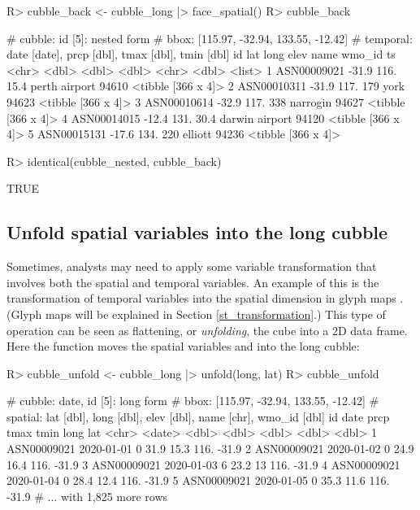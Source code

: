 \documentclass[
]{jss}
\begin{document}
\begin{CodeChunk}
\begin{CodeInput}
R> cubble_back <- cubble_long |> face_spatial()
R> cubble_back
\end{CodeInput}
\begin{CodeOutput}
# cubble:   id [5]: nested form
# bbox:     [115.97, -32.94, 133.55, -12.42]
# temporal: date [date], prcp [dbl], tmax [dbl], tmin [dbl]
  id            lat  long  elev name           wmo_id ts                
  <chr>       <dbl> <dbl> <dbl> <chr>           <dbl> <list>            
1 ASN00009021 -31.9  116.  15.4 perth airport   94610 <tibble [366 x 4]>
2 ASN00010311 -31.9  117. 179   york            94623 <tibble [366 x 4]>
3 ASN00010614 -32.9  117. 338   narrogin        94627 <tibble [366 x 4]>
4 ASN00014015 -12.4  131.  30.4 darwin airport  94120 <tibble [366 x 4]>
5 ASN00015131 -17.6  134. 220   elliott         94236 <tibble [366 x 4]>
\end{CodeOutput}
\begin{CodeInput}
R> identical(cubble_nested, cubble_back)
\end{CodeInput}
\begin{CodeOutput}
[1] TRUE
\end{CodeOutput}
\end{CodeChunk}

\hypertarget{unfold}{%
\subsection{Unfold spatial variables into the long cubble}\label{unfold}}

Sometimes, analysts may need to apply some variable transformation that involves both the spatial and temporal variables. An example of this is the transformation of temporal variables into the spatial dimension in glyph maps \citep{Wickham2012-yr}. (Glyph maps will be explained in Section \ref{st_transformation}.) This type of operation can be seen as flattening, or \emph{unfolding}, the cube into a 2D data frame. Here the function  moves the spatial variables  and  into the long cubble:

\begin{CodeChunk}
\begin{CodeInput}
R> cubble_unfold <- cubble_long |> unfold(long, lat)
R> cubble_unfold
\end{CodeInput}
\begin{CodeOutput}
# cubble:  date, id [5]: long form
# bbox:    [115.97, -32.94, 133.55, -12.42]
# spatial: lat [dbl], long [dbl], elev [dbl], name [chr], wmo_id [dbl]
  id          date        prcp  tmax  tmin  long   lat
  <chr>       <date>     <dbl> <dbl> <dbl> <dbl> <dbl>
1 ASN00009021 2020-01-01     0  31.9  15.3  116. -31.9
2 ASN00009021 2020-01-02     0  24.9  16.4  116. -31.9
3 ASN00009021 2020-01-03     6  23.2  13    116. -31.9
4 ASN00009021 2020-01-04     0  28.4  12.4  116. -31.9
5 ASN00009021 2020-01-05     0  35.3  11.6  116. -31.9
# ... with 1,825 more rows
\end{CodeOutput}
\end{CodeChunk}
\end{document}
